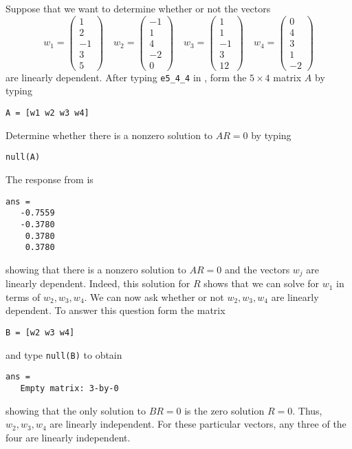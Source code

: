 \documentclass{ximera}
\begin{document}
Suppose that we want to determine whether or not the vectors
\begin{equation*}
w_1 = \left(\begin{array}{r} 1 \\ 2 \\ -1 \\ 3 \\ 5 \end{array}\right)
\quad
w_2 = \left(\begin{array}{r} -1 \\ 1 \\ 4 \\ -2 \\ 0 \end{array}\right)
\quad
w_3 = \left(\begin{array}{r} 1 \\ 1 \\ -1 \\ 3 \\ 12 \end{array}\right)
\quad
w_4 = \left(\begin{array}{r} 0 \\ 4 \\ 3 \\ 1 \\ -2 \end{array}\right)
\end{equation*}%
are linearly dependent.  After typing {\tt e5\_4\_4} in \Matlabp, form
the $5\times 4$ matrix $A$ by typing
\begin{verbatim}
A = [w1 w2 w3 w4]
\end{verbatim}
Determine whether there is a nonzero solution to $AR=0$ by typing
\begin{verbatim}
null(A)
\end{verbatim} 
The response from \Matlab is
\begin{verbatim}
ans =
   -0.7559
   -0.3780
    0.3780
    0.3780
\end{verbatim}
showing that there is a nonzero solution to $AR=0$ and the vectors
$w_j$ are linearly dependent.  Indeed, this solution for $R$ shows
that we can solve for $w_1$ in terms of $w_2,w_3,w_4$.
We can now ask whether or not $w_2,w_3,w_4$ are linearly dependent.
To answer this question form the matrix
\begin{verbatim}
B = [w2 w3 w4]
\end{verbatim}
and type {\tt null(B)} to obtain
\begin{verbatim}
ans =
   Empty matrix: 3-by-0
\end{verbatim}
showing that the only solution to $BR=0$ is the zero solution $R=0$.
Thus, $w_2,w_3,w_4$ are linearly independent.  For these particular
vectors, any three of the four are linearly independent.
\end{document}
